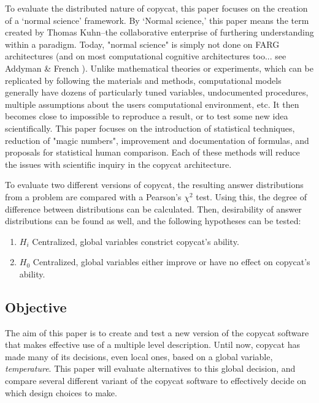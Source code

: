 \documentclass[a4paper]{article}
\begin{document}
To evaluate the distributed nature of copycat, this paper focuses on the creation of a `normal science' framework.
By `Normal science,' this paper means the term created by Thomas Kuhn--the collaborative enterprise of furthering understanding within a paradigm. 
Today, "normal science" is simply not done on FARG architectures (and on most computational cognitive architectures too... see Addyman \& French \cite{compmodeling}). 
Unlike mathematical theories or experiments, which can be replicated by following the materials and methods, computational models generally have dozens of particularly tuned variables, undocumented procedures, multiple assumptions about the users computational environment, etc.
It then becomes close to impossible to reproduce a result, or to test some new idea scientifically. 
This paper focuses on the introduction of statistical techniques, reduction of "magic numbers", improvement and documentation of formulas, and proposals for statistical human comparison.
Each of these methods will reduce the issues with scientific inquiry in the copycat architecture.

To evaluate two different versions of copycat, the resulting answer distributions from a problem are compared with a Pearson's $\chi^2$ test.
Using this, the degree of difference between distributions can be calculated.
Then, desirability of answer distributions can be found as well, and the following hypotheses can be tested:

\begin{enumerate}
    \item $H_i$ Centralized, global variables constrict copycat's ability.
    \item $H_0$ Centralized, global variables either improve or have no effect on copycat's ability.
\end{enumerate}

\subsection{Objective}

    The aim of this paper is to create and test a new version of the copycat software that makes effective use of a multiple level description.
    Until now, copycat has made many of its decisions, even local ones, based on a global variable, \emph{temperature}.
    This paper will evaluate alternatives to this global decision, and compare several different variant of the copycat software to effectively decide on which design choices to make.
\end{document}
